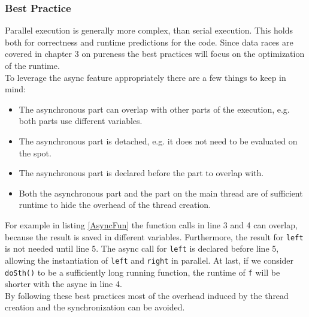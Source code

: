\subsubsection{Best Practice}
Parallel execution is generally more complex, than serial execution. This holds both for correctness and runtime predictions for the code. Since data races are covered in chapter 3 on pureness the best practices will focus on the optimization of the runtime. \\
To leverage the async feature appropriately there are a few things to keep in mind:
\begin{itemize}
\item The asynchronous part can overlap with other parts of the execution, e.g. both parts use different variables.
\item The asynchronous part is detached, e.g. it does not need to be evaluated on the spot.
\item The asynchronous part is declared before the part to overlap with.
\item Both the asynchronous part and the part on the main thread are of sufficient runtime to hide the overhead of the thread creation.
\end{itemize}
For example in listing \ref{AsyncFun} the function calls in line 3 and 4 can overlap, because the result is saved in different variables. Furthermore, the result for \texttt{left} is not needed until line 5. The async call for \texttt{left} is declared before line 5, allowing the instantiation of \texttt{left} and \texttt{right} in parallel. At last, if we consider \texttt{doSth()} to be a sufficiently long running function, the runtime of \texttt{f} will be shorter with the async in line 4.\\
By following these best practices most of the overhead induced by the thread creation and the synchronization can be avoided.